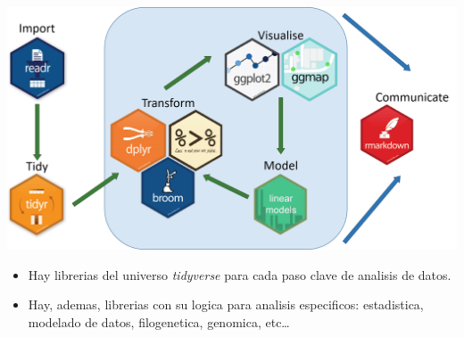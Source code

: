 \documentclass[
  10pt,
  ignorenonframetext,
]{beamer}
\providecommand{\tightlist}{%
  \setlength{\itemsep}{0pt}\setlength{\parskip}{0pt}}
\begin{document}
\begin{frame}{}
\protect\hypertarget{section}{}

\includegraphics{../../imgs/tidyverse_packages.png}

\begin{itemize}
\tightlist
\item
  Hay librerias del universo \emph{tidyverse} para cada paso clave de
  analisis de datos.
\item
  Hay, ademas, librerias con su logica para analisis especificos:
  estadistica, modelado de datos, filogenetica, genomica, etc\ldots{}
\end{itemize}
\end{frame}
\end{document}
